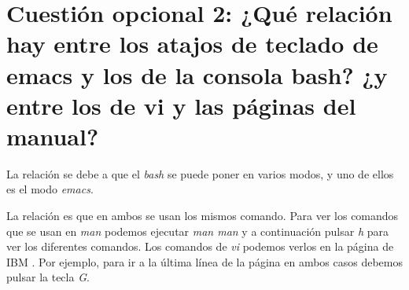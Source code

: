 \documentclass[a4paper,titlepage,12pt]{scrartcl}	%
\numberwithin{figure}{section} %
\numberwithin{table}{section} %
\begin{document}
	\section[Cuestión opcional 2: ¿Qué relación hay entre los atajos de teclado de emacs y los de la consola bash? ¿y entre los de vi y las páginas del manual?]{Cuestión opcional 2: ¿Qué relación hay entre los atajos de teclado de emacs y los de la consola bash? ¿y entre los de vi y las páginas del manual?}
	
	La relación se debe a que el \textit{bash} se puede poner en varios modos, y uno de ellos es el modo \textit{emacs}. \cite{bashemacs}
	
	La relación es que en ambos se usan los mismos comando. Para ver los comandos que se usan en \textit{man} podemos ejecutar \textit{man man} y a continuación pulsar \textit{h} para ver los diferentes comandos. Los comandos de \textit{vi} podemos verlos en la página de IBM \cite{vi}. Por ejemplo, para ir a la última línea de la página en ambos casos debemos pulsar la tecla \textit{G}.
	
	\clearpage
	
	
\end{document}

